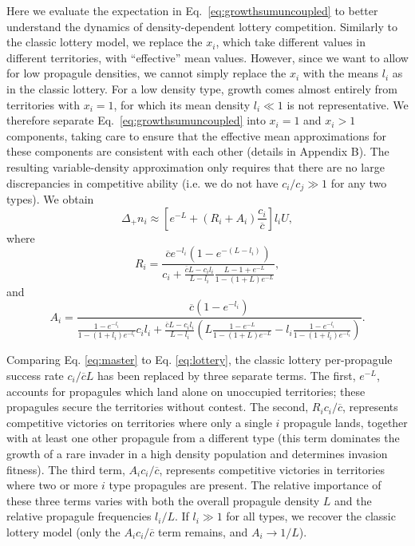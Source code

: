 \documentclass[12pt]{article}
\begin{document}
Here we evaluate the expectation in Eq.~\eqref{eq:growthsumuncoupled} to better understand the dynamics of density-dependent lottery competition. Similarly to the classic lottery model, we replace the $x_i$, which take different values in different territories, with ``effective'' mean values. However, since we want to allow for low propagule densities, we cannot simply replace the $x_i$ with the means $l_i$ as in the classic lottery. For a low density type, growth comes almost entirely from territories with $x_i=1$, for which its mean density $l_i\ll 1$ is not representative. We therefore separate Eq.~\eqref{eq:growthsumuncoupled} into $x_i=1$ and $x_i>1$ components, taking care to ensure that the effective mean approximations for these components are consistent with each other (details in Appendix B). The resulting variable-density approximation only requires that there are no large discrepancies in competitive ability (i.e. we do not have $c_i/c_j\gg 1$ for any two types). We obtain
\begin{equation}
\Delta_+ n_i\approx \left[e^{-L}+(R_i+A_i)\frac{c_i}{\overline{c}}\right]l_i U, \label{eq:master}
\end{equation}
where
\begin{equation}
R_i=\frac{\overline{c}e^{-l_i}(1-e^{-(L-l_i)})}{c_i +\frac{\overline{c}L- c_il_i}{L-l_i}\frac{L-1+e^{-L}}{1-(1+L)e^{-L}}},\nonumber \label{eq:Dr}
\end{equation}
and
\begin{equation}
A_i=\frac{\overline{c}(1-e^{-l_i})}{\frac{1-e^{-l_i}}{1-(1+l_i)e^{-l_i}}c_il_i+\frac{\overline{c}L- c_il_i}{L-l_i}\left(L\frac{1-e^{-L}}{1-(1+L)e^{-L}}-l_i\frac{1-e^{-l_i}}{1-(1+l_i)e^{-l_i}}\right)}. \nonumber \label{eq:Da}
\end{equation}

Comparing Eq. \eqref{eq:master} to Eq. \eqref{eq:lottery}, the classic lottery per-propagule success rate $c_i/\overline{c}L$ has been replaced by three separate terms. The first, $e^{-L}$, accounts for propagules which land alone on unoccupied territories; these propagules secure the territories without contest. The second, $R_i c_i/\overline{c}$, represents competitive victories on territories where only a single $i$ propagule lands, together with at least one other propagule from a different type (this term dominates the growth of a rare invader in a high density population and determines invasion fitness). The third term, $A_i c_i/\overline{c}$, represents competitive victories in territories where two or more $i$ type propagules are present. The relative importance of these three terms varies with both the overall propagule density $L$ and the relative propagule frequencies $l_i/L$. If $l_i\gg 1$ for all types, we recover the classic lottery model (only the $A_ic_i/\overline{c}$ term remains, and $A_i\rightarrow 1/L$). 
\end{document}
